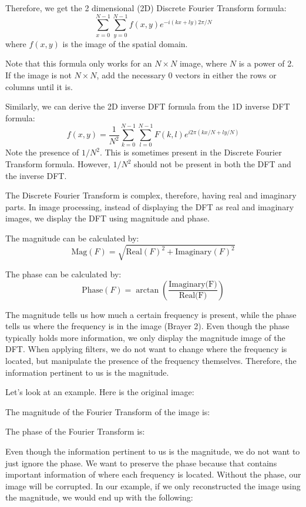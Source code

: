 \documentclass [../article.tex]{subfiles}
\begin{document}
  Therefore, we get the 2 dimensional (2D) Discrete Fourier
  Transform formula:
  \[\sum_{x=0}^{N-1}\sum_{y=0}^{N-1}f(x,y)e^{-i(kx+ly)2\pi/N}\]
  where $f(x,y)$ is the image of the spatial domain.

  Note that this formula only works for an $N \times N$ image,
  where $N$ is a power of 2. If the image is not $N \times N$,
  add the necessary 0 vectors in either the rows or columns
  until it is.

  Similarly, we can derive the 2D inverse DFT formula from the
  1D inverse DFT formula:
  \[f(x,y) = \frac{1}{N^2}\sum_{k=0}^{N-1}\sum_{l=0}^{N-1}
    F(k,l)e^{i2\pi(kx/N+ly/N)}\]
  Note the presence of $1/N^2$. This is sometimes present
  in the Discrete Fourier Transform formula. However,
  $1/N^2$ should not be present in both the DFT and the
  inverse DFT.

  The Discrete Fourier Transform is complex, therefore, having
  real and imaginary parts.  In image processing, instead of
  displaying the DFT as real and imaginary images, we display
  the DFT using magnitude and phase.

  The magnitude can be calculated by:
  \[\text{Mag}(F) = \sqrt{\text{Real}(F)^2 + \text{Imaginary}(F)^2}\]

  The phase can be calculated by:
  \[\text{Phase}(F) = \arctan\left(
  \frac{\text{Imaginary(F)}}{\text{Real(F)}}\right)\]

  The magnitude tells us how much a certain frequency is present,
  while the phase tells us where the frequency is in the image
  (Brayer 2).  Even though the phase typically holds more
  information, we only display the magnitude image of the DFT.
  When applying filters, we do not want to change where the
  frequency is located, but manipulate the presence of the
  frequency themselves.  Therefore, the information pertinent
  to us is the magnitude.

  Let's look at an example. Here is the original image:

  The magnitude of the Fourier Transform of the image is:

  The phase of the Fourier Transform is:

  Even though the information pertinent to us is the magnitude,
  we do not want to just ignore the phase. We want to preserve
  the phase because that contains important information of where
  each frequency is located. Without the phase, our image will be
  corrupted.  In our example, if we only reconstructed the image
  using the magnitude, we would end up with the following:
\end{document}
